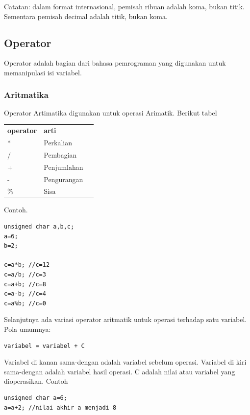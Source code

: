 \documentclass[12pt,]{article}
\begin{document}
	Catatan: dalam format internasional, pemisah ribuan adalah koma, bukan titik.
	Sementara pemisah decimal adalah titik, bukan koma.

	\newpage	
	\subsection{Operator}
	Operator adalah bagian dari bahasa pemrograman yang digunakan untuk memanipulasi isi variabel.
	
	\subsubsection{Aritmatika}
	Operator Artimatika digunakan untuk operasi Arimatik.
	Berikut tabel
	
	\begin{table}[H]
		\begin{tabular}{|l|l|l}
			\cline{1-2}
			\textbf{operator} & \textbf{arti} \\ \cline{1-2}
			* & Perkalian \\ \cline{1-2}
			/ & Pembagian \\ \cline{1-2}
			+ & Penjumlahan \\ \cline{1-2}
			- & Pengurangan \\ \cline{1-2}
			\% & Sisa \\ \cline{1-2}
		\end{tabular}
	\end{table}

	Contoh.
	\begin{verbatim}
unsigned char a,b,c;
a=6;
b=2;

c=a*b; //c=12
c=a/b; //c=3
c=a+b; //c=8
c=a-b; //c=4
c=a%b; //c=0
	\end{verbatim}
	
	Selanjutnya ada variasi operator aritmatik untuk operasi terhadap satu variabel.
	Pola umumnya:
	\begin{verbatim}
variabel = variabel + C
	\end{verbatim}

	Variabel di kanan sama-dengan adalah variabel sebelum operasi.
	Variabel di kiri sama-dengan adalah variabel hasil operasi.
	C adalah nilai atau variabel yang dioperasikan.
	Contoh
	\begin{verbatim}
unsigned char a=6;
a=a+2; //nilai akhir a menjadi 8
	\end{verbatim}
	
\end{document}
